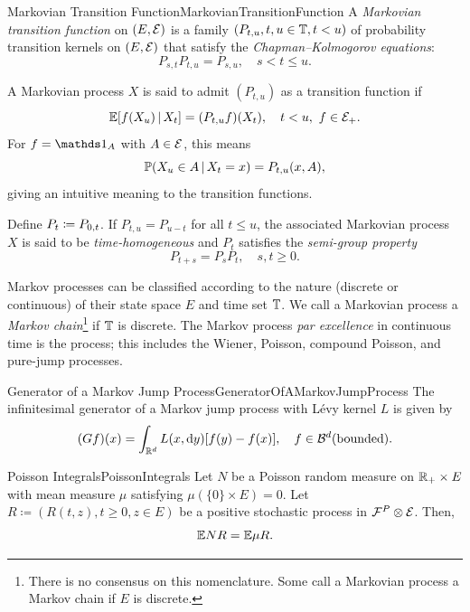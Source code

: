 \begin{defn}{Markovian Transition Function}{MarkovianTransitionFunction}
    A \emph{Markovian transition function} on \((E, \mathcal{E})\) is a family \((P_{t,u}, t, u \in \mathbb{T}, t < u)\) of probability transition kernels on \((E, \mathcal{E})\) that satisfy the \emph{Chapman--Kolmogorov equations}:
    \begin{equation}\label{eq:ChapmanKolmogorov}
        P_{s,t}P_{t,u} = P_{s,u}, \quad s < t \leq u.
    \end{equation}
\end{defn}

A Markovian process \(X\) is said to admit \((P_{t,u})\) as a transition function if
\[
    \mathbb{E}[f(X_u) \,\vert\, X_t] = (P_{t,u}f)(X_t), \quad t < u, \ f \in \mathcal{E}_+.
\]
For \(f = \I_A\) with \(A \in \mathcal{E}\), this means
\[
    \mathbb{P}(X_u \in A \,\vert\, X_t = x) = P_{t,u}(x, A),
\]
giving an intuitive meaning to the transition functions.

Define \(P_t \coloneqq P_{0,t}\). If \(P_{t,u} = P_{u-t}\) for all \(t \leq u\), the associated Markovian process \(X\) is said to be \textit{time-homogeneous} and \(P_t\) satisfies the \textit{semi-group property}
\[
    P_{t+s} = P_s P_t, \quad s, t \geq 0.
\]

Markov processes can be classified according to the nature (discrete or continuous) of their state space \(E\) and time set \(\mathbb{T}\). We call a Markovian process a \textit{Markov chain}\footnote{There is no consensus on this nomenclature. Some call a Markovian process a Markov chain if \(E\) is discrete.} if \(\mathbb{T}\) is discrete. The Markov process \textit{par excellence} in continuous time is the \Levy{} process; this includes the Wiener, Poisson, compound Poisson, and pure-jump \Levy{} processes.

\begin{thm}{Generator of a Markov Jump Process}{GeneratorOfAMarkovJumpProcess}
    The infinitesimal generator of a Markov jump process with Lévy kernel \(L\) is given by
    \begin{equation}\label{eq:GeneratorMarkovJump}
        (Gf)(x) = \int_{\mathbb{R}^d} L(x, \mathrm{d} y)[f(y) - f(x)], \quad f \in \mathcal{B}^d(\mathrm{bounded}).
    \end{equation}
\end{thm}

\begin{prop}{Poisson Integrals}{PoissonIntegrals}
    Let \(N\) be a Poisson random measure on \(\mathbb{R}_+ \times E\) with mean measure \(\mu\) satisfying \(\mu(\{0\} \times E) = 0\). Let \(R \coloneqq (R(t, z), t \geq 0, z \in E)\) be a positive stochastic process in \(\mathcal{F}^P \otimes \mathcal{E}\). Then,
    \begin{equation}\label{eq:PoissonIntegralsExpectation}
        \mathbb{E} N R = \mathbb{E} \mu R.
    \end{equation}
\end{prop}
